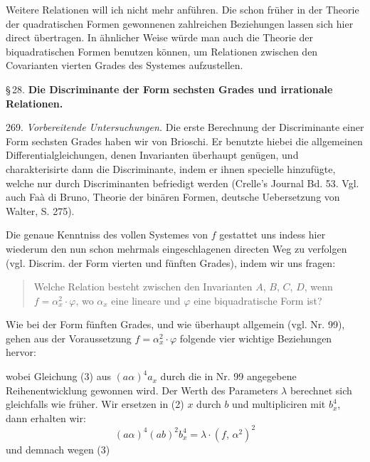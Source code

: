 Weitere Relationen will ich nicht mehr anführen. Die schon früher in der Theorie der quadratischen Formen gewonnenen zahlreichen Beziehungen lassen sich hier direct übertragen. In ähnlicher Weise würde man auch die Theorie der biquadratischen Formen benutzen können, um Relationen zwischen den Covarianten vierten Grades des Systemes aufzustellen.

\S\,28. \textbf{Die Discriminante der Form sechsten Grades und irrationale Relationen.}

269. \textit{Vorbereitende Untersuchungen.} Die erste Berechnung der Discriminante einer Form sechsten Grades haben wir von Brioschi. Er benutzte hiebei die allgemeinen Differentialgleichungen, denen Invarianten überhaupt genügen, und charakterisirte dann die Discriminante, indem er ihnen specielle hinzufügte, welche nur durch Discriminanten befriedigt werden (Crelle's Journal Bd. 53. Vgl. auch Faà di Bruno, \glqq Theorie der binären Formen\grqq{}, deutsche Uebersetzung von Walter, S. 275).

Die genaue Kenntniss des vollen Systemes von $f$ gestattet uns indess hier wiederum den nun schon mehrmals eingeschlagenen directen Weg zu verfolgen (vgl. Discrim. der Form vierten und fünften Grades), indem wir uns fragen:

\begin{quote}
\glqq Welche Relation besteht zwischen den Invarianten $A$, $B$, $C$, $D$, wenn $f=\alpha_x^2\cdot\varphi$, wo $\alpha_x$ eine lineare und $\varphi$ eine biquadratische Form ist?\grqq{}
\end{quote}

Wie bei der Form fünften Grades, und wie überhaupt allgemein (vgl. Nr. 99), gehen aus der Voraussetzung $f=\alpha_x^2\cdot\varphi$ folgende vier wichtige Beziehungen hervor:




wobei Gleichung (3) aus $(a\alpha)^4a_x$ durch die in Nr. 99 angegebene Reihenentwicklung gewonnen wird. Der Werth des Parameters $\lambda$ berechnet sich gleichfalls wie früher. Wir ersetzen in (2) $x$ durch $b$ und multipliciren mit $b_x^4$, dann erhalten wir:
\[
(a\alpha)^4(ab)^2b_x^4=\lambda\cdot(f,\,\alpha^2)^2
\]
und demnach wegen (3)

